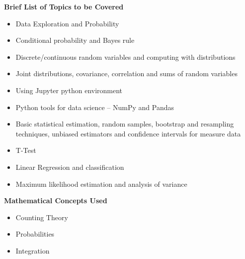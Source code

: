 {    \noindent \textbf{Brief List of Topics to be Covered}
    \begin{itemize}
        \item Data Exploration and Probability
        \item Conditional probability and Bayes rule
        \item Discrete/continuous random variables and computing with distributions
        \item Joint distributions, covariance, correlation and sums of random variables
        \item Using Jupyter python environment
        \item Python tools for data science – NumPy and Pandas
        \item Basic statistical estimation, random samples, bootstrap and resampling techniques, unbiased estimators and confidence intervals for measure data
        \item T-Test
        \item Linear Regression and classification
        \item Maximum likelihood estimation and analysis of variance
    \end{itemize}
    
    \noindent \textbf{Mathematical Concepts Used}
    \begin{itemize}
        \item Counting Theory
        \item Probabilities
        \item Integration
    \end{itemize}
}

